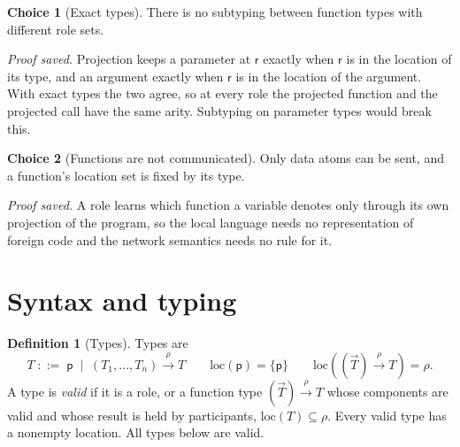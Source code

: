 \documentclass[11pt]{report}
\theoremstyle{plain}
\theoremstyle{definition}
\newtheorem{definition}[theorem]{Definition}
\newtheorem{choice}{Choice}[chapter]
\theoremstyle{remark}
\newcommand{\pp}{\mathsf{p}}
\newcommand{\rr}{\mathsf{r}}
\newcommand{\loc}[1]{\mathrm{loc}(#1)}
\newcommand{\farr}[3]{(#1) \xrightarrow{#2} #3}
\begin{document}
\begin{choice}[Exact types]\label{cho:c4-exact}
  There is no subtyping between function types with different role sets.

  \emph{Proof saved.}  Projection keeps a parameter at $\rr$ exactly when
  $\rr$ is in the location of its type, and an argument exactly when $\rr$ is
  in the location of the argument.  With exact types the two agree, so at
  every role the projected function and the projected call have the same
  arity.  Subtyping on parameter types would break this.
\end{choice}

\begin{choice}[Functions are not communicated]\label{cho:c4-nocomm}
  Only data atoms can be sent, and a function's location set is fixed by its
  type.

  \emph{Proof saved.}  A role learns which function a variable denotes only
  through its own projection of the program, so the local language needs no representation of foreign code and the network
  semantics needs no rule for it.
\end{choice}

\section{Syntax and typing}
\label{sec:c4-syntax}

\begin{definition}[Types]\label{def:c4-types}
  Types are
  \[
    T \;::=\; \pp \;\mid\; \farr{T_1,\ldots,T_n}{\rho}{T}
    \qquad
    \loc{\pp}=\{\pp\}
    \qquad
    \loc{\farr{\vec T}{\rho}{T}}=\rho.
  \]
  A type is \emph{valid} if it is a role, or a function type
  $\farr{\vec T}{\rho}{T}$ whose components are valid and whose result is held
  by participants, $\loc{T}\subseteq\rho$.  Every valid type has a nonempty
  location.  All types below are valid.
\end{definition}
\end{document}
